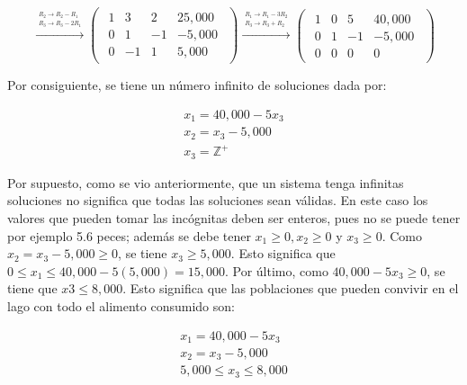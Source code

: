 \documentclass{article}
\begin{document}
\begin{equation*}
    \xrightarrow{\overset{\begin{aligned} R_2 \rightarrow R_2 - R_1 \\ R_3 \rightarrow R_3 - 2R_1\end{aligned}}{}} 
    \begin{pmatrix}
        \begin{array}{rrr|r}
            1& 3 & 2 & 25,000\\
            0 & 1 &-1 &-5,000 \\
            0 & -1 & 1 & 5,000
        \end{array}
    \end{pmatrix}
    \xrightarrow{\overset{\begin{aligned} R_1 \rightarrow R_1 - 3R_2 \\ R_3 \rightarrow R_3 + R_2\end{aligned}}{}} 
    \begin{pmatrix}
        \begin{array}{rrr|r}
            1 & 0 & 5 & 40,000\\
            0 & 1 & -1 & -5,000\\
            0 & 0 & 0 & 0
        \end{array}
    \end{pmatrix}
\end{equation*}

Por consiguiente, se tiene un número infinito de soluciones dada por: 

\begin{equation*}
    \begin{aligned}
        x_1 = 40,000 - 5x_3\\
        x_2 = x_3 - 5,000\\
        x_3 = \mathbb{Z}^+
    \end{aligned}
\end{equation*}

Por supuesto, como se vio anteriormente, que un sistema tenga infinitas soluciones no significa que todas las soluciones sean válidas. En este caso los valores que pueden tomar las incógnitas deben ser enteros, pues no se puede tener por ejemplo 5.6 peces; además se debe tener $x_1 \geq 0, x_2 \geq 0$ y $x_3 \geq 0$. Como $x_2 = x_3 - 5,000 \geq 0$, se tiene $x_3 \geq 5,000$. Esto significa que $0 \leq x_1 \leq 40,000 - 5(5,000)= 15,000$. Por último, como $40,000 - 5x_3 \geq 0$, se tiene que $x3 \leq 8,000$. Esto significa que las poblaciones que pueden convivir en el lago con todo el alimento consumido son: 

\begin{equation*}
    \begin{aligned}
        x_1 = 40,000 -5x_3\\
        x_2 = x_3 - 5,000\\
        5,000 \leq x_3 \leq 8,000
    \end{aligned}
\end{equation*}
\end{document}
